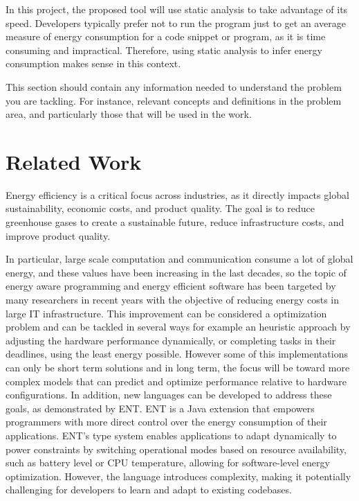 \documentclass[sigplan]{acmart}
\begin{document}
In this project, the proposed tool will use static analysis to take advantage of its speed. Developers typically prefer not to run the program just to get an average measure of energy consumption for a code snippet or program, as it is time consuming and impractical. Therefore, using static analysis to infer energy consumption makes sense in this context.

This section should contain any information needed to understand the problem you are tackling. For instance, relevant concepts and definitions in the problem area, and particularly those that will be used in the work.

\section{Related Work} \label{sec:relatedwork}

Energy efficiency is a critical focus across industries, as it directly impacts global sustainability, economic costs, and product quality.  The goal is to reduce greenhouse gases to create a sustainable future, reduce infrastructure costs, and improve product quality\cite{annurev:/content/journals/10.1146/annurev.resource.102308.124234}. 

In particular, large scale computation and communication consume a lot of global energy, and these values have been increasing in the last decades, so the topic of energy aware programming and energy efficient software has been targeted by many researchers in recent years with the objective of reducing energy costs in large IT infrastructure. This improvement can be considered a optimization problem and can be tackled in several ways for example an heuristic approach by adjusting the hardware performance dynamically, or completing tasks in their deadlines, using the least energy possible. However some of this implementations can only be short term solutions and in long term, the focus will be toward more complex models that can predict and optimize performance relative to hardware configurations\cite{10.1145/1666420.1666438}.
In addition, new languages can be developed to address these goals, as demonstrated by ENT\cite{10.1145/3062341.3062356}. ENT is a Java extension that empowers programmers with more direct control over the energy consumption of their applications. ENT’s type system enables applications to adapt dynamically to power constraints by switching operational modes based on resource availability, such as battery level or CPU temperature, allowing for software-level energy optimization. However, the language introduces complexity, making it potentially challenging for developers to learn and adapt to existing codebases.
\end{document}
